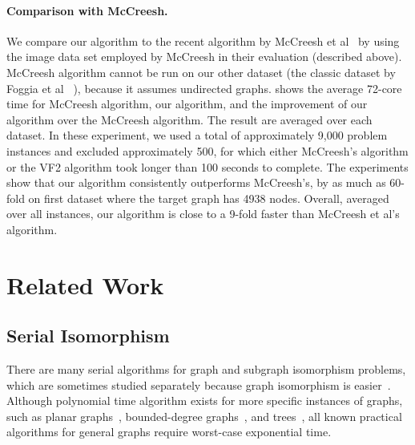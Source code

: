 
\paragraph{Comparison with McCreesh.}  
%
We compare our algorithm to the recent algorithm by McCreesh et
al~\cite{McCreesh15} by using the image data set employed by McCreesh in
their evaluation (described above).
%
McCreesh algorithm cannot be run on our other dataset (the classic
dataset by Foggia et al ~\cite{argdatabase1}), because it assumes
undirected graphs.
%
 shows the average 72-core time for McCreesh
algorithm, our algorithm, and the improvement of our algorithm over
the McCreesh algorithm. 
%
The result are averaged over each dataset.
%
In these experiment, we used a total of approximately 9,000 problem
instances and excluded approximately 500, for which either McCreesh's algorithm or
the VF2 algorithm took longer than 100 seconds to complete.
%
The experiments show that our algorithm consistently outperforms
McCreesh's, by as much as 60-fold on first dataset where the target graph
has 4938 nodes.
%
Overall, averaged over all instances, our algorithm is close to a
9-fold faster than McCreesh et al's algorithm.

%
%
%

%
\section{Related Work}
\subsection{Serial Isomorphism}
There are many serial algorithms for graph and subgraph isomorphism
problems, which are sometimes studied separately because graph
isomorphism is easier~\cite{babai}.
%
Although polynomial time algorithm exists for more specific instances
of graphs, such as planar graphs~\cite{planargraphs}, bounded-degree
graphs~\cite{bounded-degree}, and trees~\cite{trees}, all known
practical algorithms for general graphs require worst-case exponential
time.


